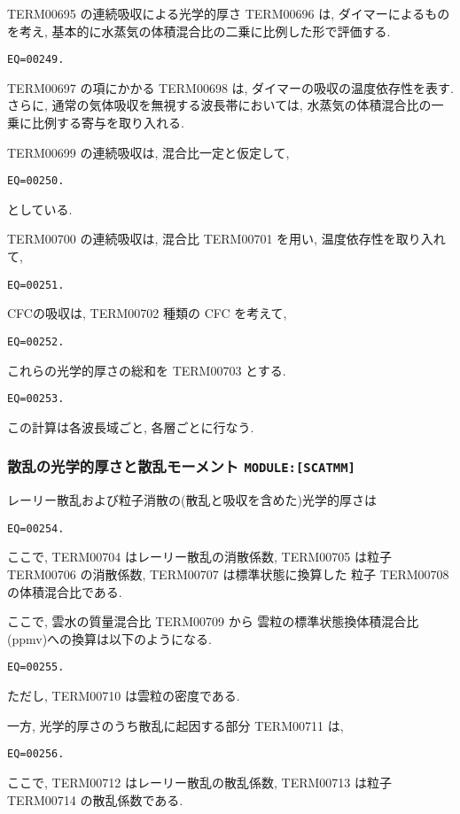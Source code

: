 TERM00695 の連続吸収による光学的厚さ TERM00696 は,
ダイマーによるものを考え, 
基本的に水蒸気の体積混合比の二乗に比例した形で評価する.
\begin{verbatim}
EQ=00249.
\end{verbatim}

TERM00697 の項にかかる TERM00698 は, 
ダイマーの吸収の温度依存性を表す.
さらに, 通常の気体吸収を無視する波長帯においては,
水蒸気の体積混合比の一乗に比例する寄与を取り入れる.

TERM00699 の連続吸収は, 混合比一定と仮定して,
\begin{verbatim}
EQ=00250.
\end{verbatim}
としている.

TERM00700 の連続吸収は, 混合比 TERM00701 を用い, 温度依存性を取り入れて,
\begin{verbatim}
EQ=00251.
\end{verbatim}

CFCの吸収は, TERM00702 種類の CFC を考えて,
\begin{verbatim}
EQ=00252.
\end{verbatim}

これらの光学的厚さの総和を TERM00703 とする.
\begin{verbatim}
EQ=00253.
\end{verbatim}

この計算は各波長域ごと, 各層ごとに行なう.

\subsubsection{散乱の光学的厚さと散乱モーメント \texttt{MODULE:[SCATMM]}}

レーリー散乱および粒子消散の(散乱と吸収を含めた)光学的厚さは
\begin{verbatim}
EQ=00254.
\end{verbatim}
ここで, TERM00704 はレーリー散乱の消散係数,
TERM00705 は粒子 TERM00706 の消散係数,
TERM00707 は標準状態に換算した
粒子 TERM00708 の体積混合比である.

ここで, 雲水の質量混合比 TERM00709 から
雲粒の標準状態換体積混合比(ppmv)への換算は以下のようになる.
\begin{verbatim}
EQ=00255.
\end{verbatim}
ただし, TERM00710 は雲粒の密度である.

一方, 光学的厚さのうち散乱に起因する部分 TERM00711 は,
\begin{verbatim}
EQ=00256.
\end{verbatim}
ここで, TERM00712 はレーリー散乱の散乱係数,
TERM00713 は粒子 TERM00714 の散乱係数である.

